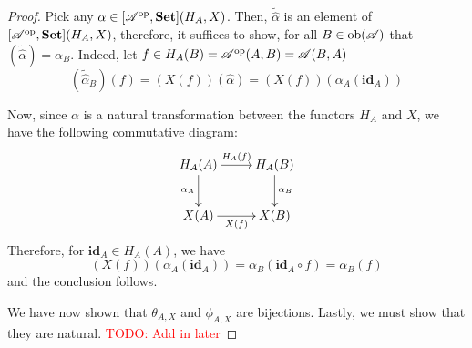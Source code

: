 \begin{proof}
Pick any $\alpha\in[\mathscr{A}^{\text{op}},\mathbf{Set}](H_A,X)$. Then, $\widetilde{\widehat{\alpha}}$ is an element of $[\mathscr{A}^{\text{op}},\mathbf{Set}](H_A,X)$, therefore, it suffices to show, for all $B\in\operatorname{ob}(\mathscr{A})$ that $(\widetilde{\widehat{\alpha}}) = \alpha_B$. Indeed, let $f\in H_A(B) = \mathscr{A}^{\text{op}}(A,B) = \mathscr{A}(B,A)$
\begin{equation*}
    (\widetilde{\widehat{\alpha}}_B)(f) = (X(f))(\widehat{\alpha}) = (X(f))(\alpha_A(\mathbf{id}_A))
\end{equation*}

Now, since $\alpha$ is a natural transformation between the functors $H_A$ and $X$, we have the following commutative diagram:
\begin{equation*}
\xymatrix{
    H_A(A)\ar[r]^{H_A(f)}\ar[d]_{\alpha_A} & H_A(B)\ar[d]^{\alpha_B}\\
    X(A)\ar[r]_{X(f)} & X(B)
}
\end{equation*}
Therefore, for $\mathbf{id}_A\in H_A(A)$, we have 
\begin{equation*}
    (X(f))(\alpha_A(\mathbf{id}_A)) = \alpha_B(\mathbf{id}_A\circ f) = \alpha_B(f)
\end{equation*}
and the conclusion follows.

We have now shown that $\theta_{A,X}$ and $\phi_{A,X}$ are bijections. Lastly, we must show that they are natural. \textcolor{red}{TODO: Add in later}
\end{proof}